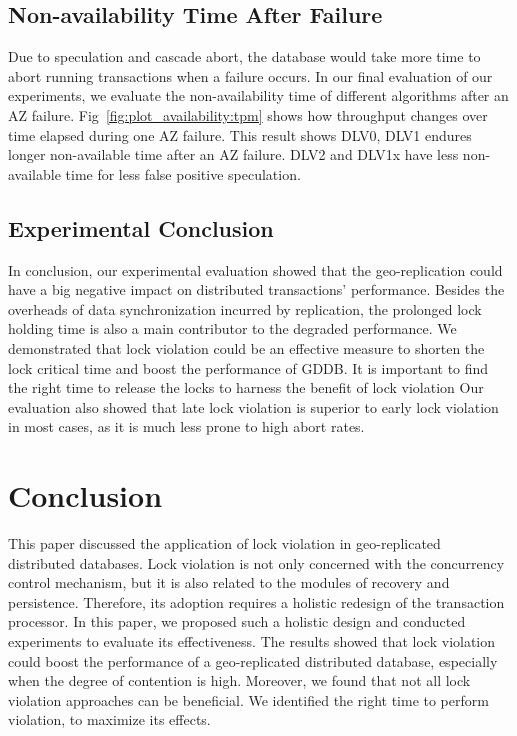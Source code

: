 \documentclass[conference]{IEEEtran}
\begin{document}
\subsection{Non-availability Time After Failure}

Due to speculation and cascade abort, the database would take more time to abort running transactions when a failure occurs.
In our final evaluation of our experiments, we evaluate the non-availability time of different algorithms after an AZ failure.
Fig~\ref{fig:plot_availability:tpm} shows how throughput changes over time elapsed during one AZ failure.
This result shows DLV0, DLV1 endures longer non-available time after an AZ failure.
DLV2 and DLV1x have less non-available time for less false positive speculation.


\subsection{Experimental Conclusion}

In conclusion, our experimental evaluation showed that the geo-replication could have a big negative impact on distributed transactions' performance.
Besides the overheads of data synchronization incurred by replication, the prolonged lock holding time is also a main contributor to the degraded performance.
We demonstrated that lock violation could be an effective measure to shorten the lock critical time and boost the performance of GDDB.
It is important to find the right time to release the locks  to harness the benefit of lock violation
Our evaluation also showed that late lock violation is superior to early lock violation in most cases, as it is much less prone to high abort rates.


\section{Conclusion}
\label{sec:conclusion}

This paper discussed the application of lock violation in geo-replicated distributed databases.
Lock violation is not only concerned with the concurrency control mechanism, but it is also related to the modules of recovery and persistence.
Therefore, its adoption requires a holistic redesign of the transaction processor.
In this paper, we proposed such a holistic design and conducted experiments to evaluate its effectiveness.
The results showed that lock violation could boost the performance of a geo-replicated distributed database, especially when the degree of contention is high.
Moreover, we found that not all lock violation approaches can be beneficial. We identified the right time to perform violation, to maximize its effects.
\end{document}
